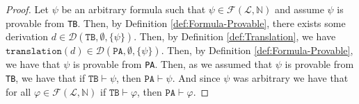 \begin{proof}
    \leanok
    Let $\psi$ be an arbitrary formula such that $\psi \in \mathcal{F}(\mathcal{L},\mathbb{N})$ and assume $\psi$ is provable from \texttt{TB}. Then, by Definition \ref{def:Formula-Provable}, there exists some derivation $d \in \mathcal{D}(\texttt{TB},\emptyset,\{\psi\})$. Then, by Definition \ref{def:Translation}, we have $\texttt{translation}(d) \in \mathcal{D}(\texttt{PA},\emptyset,\{\psi\})$. Then, by Definition \ref{def:Formula-Provable}, we have that $\psi$ is provable from \texttt{PA}. Then, as we assumed that $\psi$ is provable from \texttt{TB}, we have that if $\texttt{TB} \vdash \psi$, then $\texttt{PA} \vdash \psi$. And since $\psi$ was arbitrary we have that for all $\varphi \in \mathcal{F}(\mathcal{L}, \mathbb{N})$ if $\texttt{TB} \vdash \varphi$, then $\texttt{PA} \vdash \varphi$.
\end{proof}



